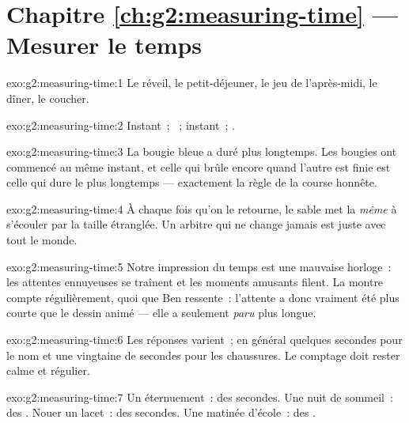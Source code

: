 \section*{Chapitre \ref{ch:g2:measuring-time} --- Mesurer le temps}

\begin{solution}{exo:g2:measuring-time:1}
Le réveil, le petit-déjeuner, le jeu de l'après-midi, le dîner, le
coucher.
\end{solution}

\begin{solution}{exo:g2:measuring-time:2}
Instant~; ~; instant~; .
\end{solution}

\begin{solution}{exo:g2:measuring-time:3}
La bougie bleue a duré plus longtemps. Les bougies ont commencé au
même instant, et celle qui brûle encore quand l'autre est finie est
celle qui dure le plus longtemps --- exactement la règle de la course
honnête.
\end{solution}

\begin{solution}{exo:g2:measuring-time:4}
À chaque fois qu'on le retourne, le sable met la \emph{même}  à
s'écouler par la taille étranglée. Un arbitre qui ne change jamais
est juste avec tout le monde.
\end{solution}

\begin{solution}{exo:g2:measuring-time:5}
Notre impression du temps est une mauvaise horloge~: les attentes
ennuyeuses se traînent et les moments amusants filent. La montre
compte régulièrement, quoi que Ben ressente~: l'attente a donc
vraiment été plus courte que le dessin animé --- elle a seulement
\emph{paru} plus longue.
\end{solution}

\begin{solution}{exo:g2:measuring-time:6}
Les réponses varient~; en général quelques secondes pour le nom et
une vingtaine de secondes pour les chaussures. Le comptage doit
rester calme et régulier.
\end{solution}

\begin{solution}{exo:g2:measuring-time:7}
Un éternuement~: des secondes. Une nuit de sommeil~: des .
Nouer un lacet~: des secondes. Une matinée d'école~: des .
\end{solution}

